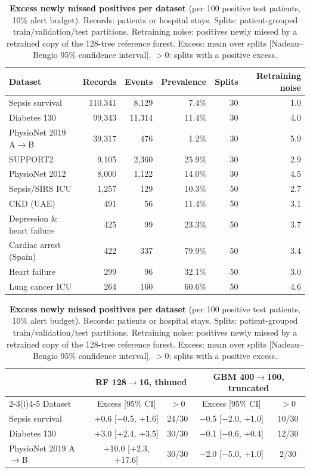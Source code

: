 \begin{table}[!htb]
\centering
\caption{\textbf{Excess newly missed positives per dataset} (per 100 positive test patients, 10\% alert budget). Records: patients or hospital stays. Splits: patient-grouped train/validation/test partitions. Retraining noise: positives newly missed by a retrained copy of the 128-tree reference forest. Excess: mean over splits [Nadeau--Bengio 95\% confidence interval]. $>0$: splits with a positive excess.}
\label{tab:PER-DATASET}
{\small
\begin{tabular}{lrrrrr}
\toprule
Dataset & Records & Events & Prevalence & Splits & Retraining noise \\
\midrule
Sepsis survival & 110{,}341 & 8{,}129 & 7.4\% & 30 & 1.0 \\
Diabetes 130 & 99{,}343 & 11{,}314 & 11.4\% & 30 & 4.0 \\
PhysioNet 2019 A$\rightarrow$B & 39{,}317 & 476 & 1.2\% & 30 & 5.9 \\
SUPPORT2 & 9{,}105 & 2{,}360 & 25.9\% & 30 & 2.9 \\
PhysioNet 2012 & 8{,}000 & 1{,}122 & 14.0\% & 30 & 4.5 \\
Sepsis/SIRS ICU & 1{,}257 & 129 & 10.3\% & 50 & 2.7 \\
CKD (UAE) & 491 & 56 & 11.4\% & 50 & 3.1 \\
Depression \& heart failure & 425 & 99 & 23.3\% & 50 & 3.7 \\
Cardiac arrest (Spain) & 422 & 337 & 79.9\% & 50 & 3.4 \\
Heart failure & 299 & 96 & 32.1\% & 50 & 3.0 \\
Lung cancer ICU & 264 & 160 & 60.6\% & 50 & 4.6 \\
\bottomrule
\end{tabular}
\par\vspace{1.2em}
\begin{tabular}{lcccc}
\toprule
 & \multicolumn{2}{c}{RF 128$\rightarrow$16, thinned} & \multicolumn{2}{c}{GBM 400$\rightarrow$100, truncated} \\
\cmidrule(lr){2-3}\cmidrule(l){4-5}
\rowcolor{white}Dataset & Excess [95\% CI] & $>0$ & Excess [95\% CI] & $>0$ \\
\midrule
Sepsis survival & +0.6 [$-$0.5, +1.6] & 24/30 & $-$0.5 [$-$2.0, +1.0] & 10/30 \\
Diabetes 130 & +3.0 [+2.4, +3.5] & 30/30 & $-$0.1 [$-$0.6, +0.4] & 12/30 \\
PhysioNet 2019 A$\rightarrow$B & +10.0 [+2.3, +17.6] & 30/30 & $-$2.0 [$-$5.0, +1.0] & 2/30 \\

\end{tabular}}
\end{table}
